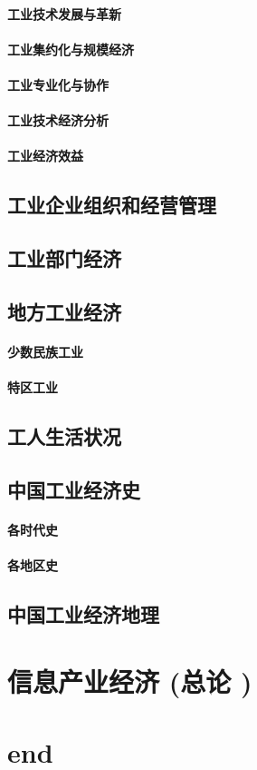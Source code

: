 \documentclass[UTF8]{../../RepresentationUniverse}
\begin{document}
    \subsubsection{工业技术发展与革新}
    \subsubsection{工业集约化与规模经济}
    \subsubsection{工业专业化与协作}
    \subsubsection{工业技术经济分析}
    \subsubsection{工业经济效益}
\section{工业企业组织和经营管理}
\section{工业部门经济}
\section{地方工业经济}
    \subsubsection{少数民族工业}
    \subsubsection{特区工业}
\section{工人生活状况}
\section{中国工业经济史}
    \subsubsection{各时代史}
    \subsubsection{各地区史}
\section{中国工业经济地理}





    
\chapter{信息产业经济 (总论 )}









\chapter{end}
\end{document}
